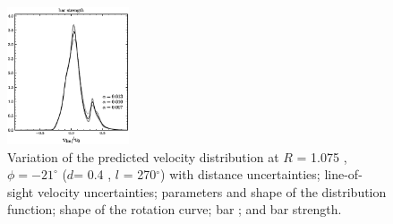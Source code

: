 \begin{figure}
\includegraphics[width=0.32\textwidth]{figs_hercules/barstrength.ps}
\caption[Variation of the predicted velocity distribution at $R$ =
  1.075 \Ro , $\phi = -21^{\circ}$ ($d$= 0.4 \Ro, $l$ = 270$^{\circ}$)
  with model parameter changes]{Variation of the predicted velocity
  distribution at $R$ = 1.075 \Ro , $\phi = -21^{\circ}$ ($d$= 0.4
  \Ro, $l$ = 270$^{\circ}$) with distance uncertainties; line-of-sight
  velocity uncertainties; parameters and shape of the distribution
  function; shape of the rotation curve; bar \Rolr; and bar
  strength.}\label{fig:1dvar}
\end{figure}



